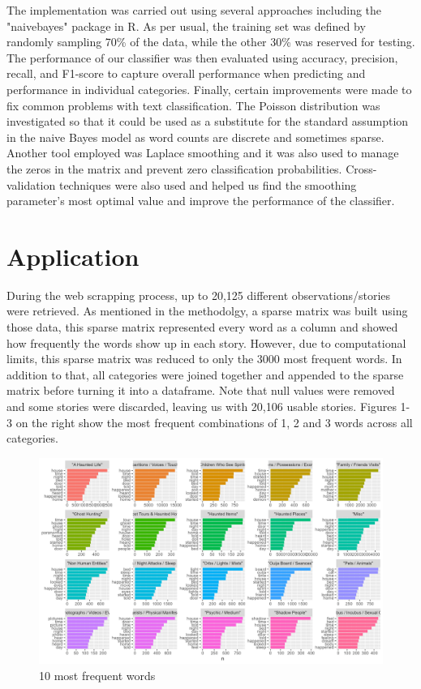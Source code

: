 \documentclass[twocolumn]{article}
\begin{document}
The implementation was carried out using several approaches including the "naivebayes" package in R. As per usual, the training set was defined by randomly sampling 70\% of the data, while the other 30\% was reserved for testing. The performance of our classifier was then evaluated using accuracy, precision, recall, and F1-score to capture overall performance when predicting and performance in individual categories.
Finally, certain improvements were made to fix common problems with text classification.  The Poisson distribution was investigated so that it could be used as a substitute for the standard assumption in the naive Bayes model as word counts are discrete and sometimes sparse. Another tool employed was Laplace smoothing and it was also used to manage the zeros in the matrix and prevent zero classification probabilities. Cross-validation techniques were also used and helped us find the smoothing parameter's most optimal value and improve the performance of the classifier.



\section{Application}
During the web scrapping process, up to 20,125 different observations/stories were retrieved. As mentioned in the methodolgy, a sparse matrix was built using those data, this sparse matrix represented every word as a column and showed how frequently the words show up in each story. However, due to computational limits, this sparse matrix was reduced to only the 3000 most frequent words. In addition to that, all categories were joined together and appended to the sparse matrix before turning it into a dataframe. Note that null values were removed and some stories were discarded, leaving us with 20,106 usable stories. Figures 1-3 on the right show the most frequent combinations of 1, 2 and 3 words across all categories.
\begin{figure}[htbp]
    \centering
    \includegraphics[width=1\columnwidth]{figures/unigrams.png}
    \caption{10 most frequent words}
    \label{unigrams}
\end{figure}
\end{document}
